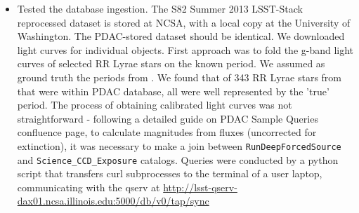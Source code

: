 \documentclass[fleqn,usenatbib, onecolumn]{mnras} %
\begin{document}
\begin{itemize}
	
    \item Tested the database ingestion. The S82 Summer 2013 LSST-Stack reprocessed dataset is stored at NCSA, with a local copy at the University of Washington.  The PDAC-stored dataset should be identical. We downloaded light curves for individual objects. First approach was to fold the g-band light curves of selected RR Lyrae stars on the known period.  We assumed as ground truth the periods from \cite{sesar2010}.  We found that of 343  RR Lyrae stars from \cite{sesar2010} that were within PDAC database,  all were well represented by the 'true' period.  The process of obtaining calibrated light curves was not straightforward  - following a detailed guide on PDAC Sample Queries confluence page,  to calculate magnitudes from fluxes (uncorrected for extinction), it was necessary to  make a join between \verb|RunDeepForcedSource| and \verb|Science_CCD_Exposure| catalogs.  Queries were conducted by  a python script that transfers curl subprocesses to the terminal of a user laptop, communicating with the qserv  at \url{http://lsst-qserv-dax01.ncsa.illinois.edu:5000/db/v0/tap/sync}

 \end{itemize}   








\bsp	%
\label{lastpage}
\end{document}
